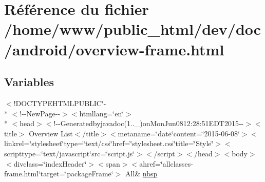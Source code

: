 \hypertarget{overview-frame_8html}{\section{Référence du fichier /home/www/public\-\_\-html/dev/doc/android/overview-\/frame.html}
\label{overview-frame_8html}
}
\subsection*{Variables}
\begin{DoxyCompactItemize}
\item 
$<$!D\-O\-C\-T\-Y\-P\-E\-H\-T\-M\-L\-P\-U\-B\-L\-I\-C\char`\"{}-\/\\*
$<$!-\/-\/New\-Page-\/-\/$>$$<$htmllang=\char`\"{}en\char`\"{}$>$\\*
$<$head$>$$<$!-\/-\/Generatedbyjavadoc(1..\-\_)on\-Mon\-Jun0812\-:28\-:51\-E\-D\-T2015-\/-\/$>$$<$title$>$ Overview List$<$/title$>$$<$metaname=\char`\"{}date\char`\"{}content=\char`\"{}2015-\/06-\/08\char`\"{}$>$$<$linkrel=\char`\"{}stylesheet\char`\"{}type=\char`\"{}text/css\char`\"{}href=\char`\"{}stylesheet.\-css\char`\"{}title=\char`\"{}\-Style\char`\"{}$>$$<$scripttype=\char`\"{}text/javascript\char`\"{}src=\char`\"{}script.\-js\char`\"{}$>$$<$/script$>$$<$/head$>$$<$body$>$$<$divclass=\char`\"{}index\-Header\char`\"{}$>$$<$span$>$$<$ahref=\char`\"{}allclasses-\/frame.\-html\char`\"{}target=\char`\"{}package\-Frame\char`\"{}$>$ All\& \hyperlink{overview-frame_8html_a6840654c8b0ae4623dbedcf1055ea13e}{nbsp}
\end{DoxyCompactItemize}


